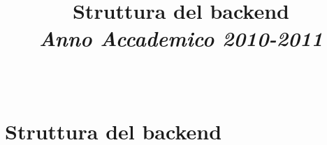 \documentclass[10pt, draft]{book}
\title{Struttura del backend\\[2mm]{\small\emph{Anno Accademico 2010-2011}}\\[4mm]}
\author{\Nome\ \Cognome}
\begin{document}
\maketitle

\tableofcontents

\chapter{Struttura del backend}

\printindex
\end{document}

